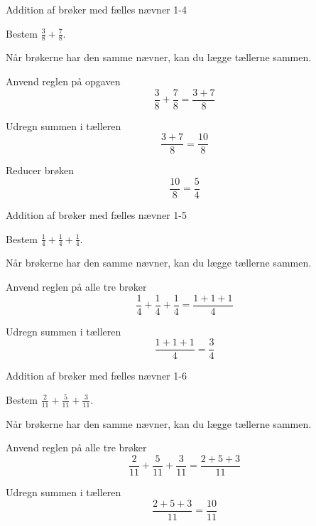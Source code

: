 \documentclass{article}
\begin{document}
\newpage

\begin{exercise}{Addition af brøker med fælles nævner 1-4}

Bestem $\frac{3}{8} + \frac{7}{8}$.


\hint

Når brøkerne har den samme nævner, kan du lægge tællerne sammen.

\hint

Anvend reglen på opgaven
\[
\frac{3}{8} + \frac{7}{8} = \frac{3 + 7}{8}
\]

\hint

Udregn summen i tælleren
\[
\frac{3 + 7}{8} = \frac{10}{8}
\]

\hint

Reducer brøken
\[
\frac{10}{8} = \frac{5}{4}
\]

\end{exercise}

\newpage

\begin{exercise}{Addition af brøker med fælles nævner 1-5}

Bestem $\frac{1}{4} + \frac{1}{4} + \frac{1}{4}$.


\hint

Når brøkerne har den samme nævner, kan du lægge tællerne sammen.

\hint

Anvend reglen på alle tre brøker
\[
\frac{1}{4} + \frac{1}{4} + \frac{1}{4} = \frac{1 + 1 + 1}{4}
\]

\hint

Udregn summen i tælleren
\[
\frac{1 + 1 + 1}{4} = \frac{3}{4}
\]

\end{exercise}

\newpage

\begin{exercise}{Addition af brøker med fælles nævner 1-6}

Bestem $\frac{2}{11} + \frac{5}{11} + \frac{3}{11}$.


\hint

Når brøkerne har den samme nævner, kan du lægge tællerne sammen.

\hint

Anvend reglen på alle tre brøker
\[
\frac{2}{11} + \frac{5}{11} + \frac{3}{11} = \frac{2 + 5 + 3}{11}
\]

\hint

Udregn summen i tælleren
\[
\frac{2 + 5 + 3}{11} = \frac{10}{11}
\]

\end{exercise}
\end{document}
